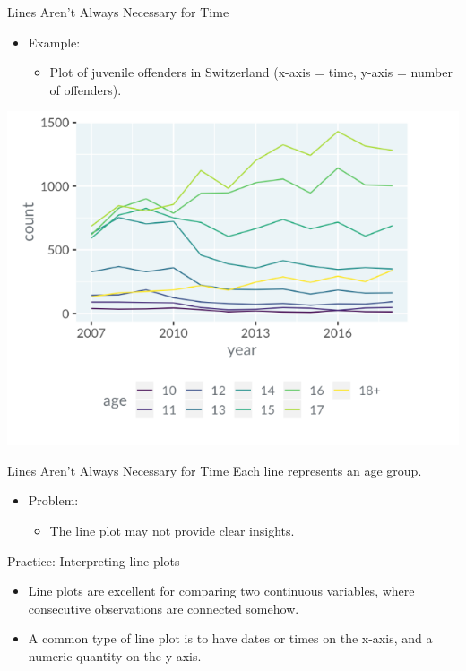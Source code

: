 \documentclass[
  ignorenonframetext,
]{beamer}
\providecommand{\tightlist}{%
  \setlength{\itemsep}{0pt}\setlength{\parskip}{0pt}}
\begin{document}
\begin{frame}{Lines Aren't Always Necessary for Time}
\label{lines-arent-always-necessary-for-time}
\begin{itemize}
\item
  Example:

  \begin{itemize}
  \tightlist
  \item
    Plot of juvenile offenders in Switzerland (x-axis = time, y-axis =
    number of offenders).
  \end{itemize}
\end{itemize}

\includegraphics{../images/im47.png}
\end{frame}

\begin{frame}{Lines Aren't Always Necessary for Time}
\label{lines-arent-always-necessary-for-time-1}
Each line represents an age group.

\begin{itemize}
\item
  Problem:

  \begin{itemize}
  \tightlist
  \item
    The line plot may not provide clear insights.
  \end{itemize}
\end{itemize}
\end{frame}

\begin{frame}{Practice: Interpreting line plots}
\label{practice-interpreting-line-plots}
\begin{itemize}
\item
  Line plots are excellent for comparing two continuous variables, where
  consecutive observations are connected somehow.
\item
  A common type of line plot is to have dates or times on the x-axis,
  and a numeric quantity on the y-axis.
\end{itemize}
\end{frame}
\end{document}
